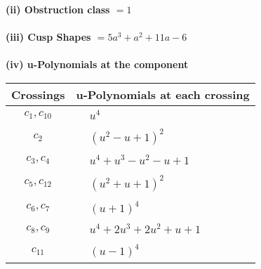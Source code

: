 \documentclass[1p]{elsarticle_modified}
\theoremstyle{definition}
\begin{document}
\flushleft \textbf{(ii) Obstruction class $= 1$}\\~\\
\flushleft \textbf{(iii) Cusp Shapes $= 5 a^3+a^2+11 a-6$}\\~\\
\newpage\renewcommand{\arraystretch}{1}
\flushleft \textbf{(iv) u-Polynomials at the component}\newline \\
\begin{tabular}{m{50pt}|m{274pt}}
Crossings & \hspace{64pt}u-Polynomials at each crossing \\
\hline $$\begin{aligned}c_{1},c_{10}\end{aligned}$$&$\begin{aligned}
&u^4
\end{aligned}$\\
\hline $$\begin{aligned}c_{2}\end{aligned}$$&$\begin{aligned}
&(u^2- u+1)^2
\end{aligned}$\\
\hline $$\begin{aligned}c_{3},c_{4}\end{aligned}$$&$\begin{aligned}
&u^4+u^3- u^2- u+1
\end{aligned}$\\
\hline $$\begin{aligned}c_{5},c_{12}\end{aligned}$$&$\begin{aligned}
&(u^2+u+1)^2
\end{aligned}$\\
\hline $$\begin{aligned}c_{6},c_{7}\end{aligned}$$&$\begin{aligned}
&(u+1)^4
\end{aligned}$\\
\hline $$\begin{aligned}c_{8},c_{9}\end{aligned}$$&$\begin{aligned}
&u^4+2 u^3+2 u^2+u+1
\end{aligned}$\\
\hline $$\begin{aligned}c_{11}\end{aligned}$$&$\begin{aligned}
&(u-1)^4
\end{aligned}$\\
\hline
\end{tabular}\\~\\
\end{document}
